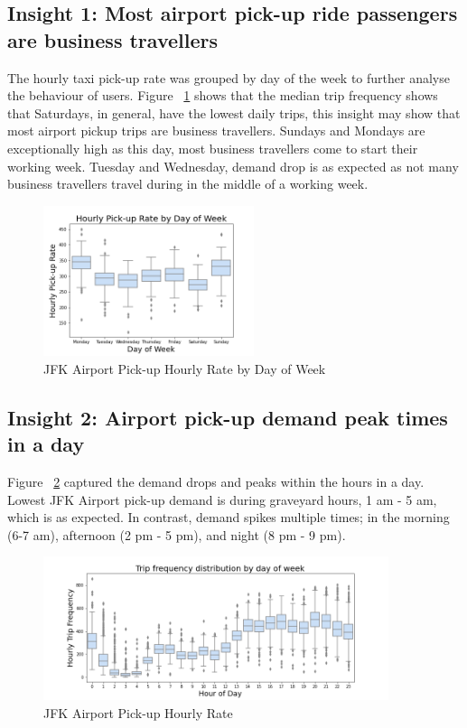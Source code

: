 \documentclass[11pt]{article}
\begin{document}
\subsection{Insight 1: Most airport pick-up ride passengers are business travellers}
The hourly taxi pick-up rate was grouped by day of the week to further analyse the behaviour of users. Figure ~\ref{fig:hour_dow} shows that the median trip frequency shows that Saturdays, in general, have the lowest daily trips, this insight may show that most airport pickup trips are business travellers. Sundays and Mondays are exceptionally high as this day, most business travellers come to start their working week. Tuesday and Wednesday, demand drop is as expected as not many business travellers travel during in the middle of a working week.
\begin{figure}[h]
    \includegraphics[width=0.55\textwidth]{plots/hourly_pickup_rate_by_dow.png}
    \centering
    \caption{JFK Airport Pick-up Hourly Rate by Day of Week} 
    \label{fig:hour_dow}
\end{figure}


\subsection{Insight 2: Airport pick-up demand peak times in a day}
Figure ~\ref{fig:hour} captured the demand drops and peaks within the hours in a day. Lowest JFK Airport pick-up demand is during graveyard hours, 1 am - 5 am, which is as expected. In contrast, demand spikes multiple times; in the morning (6-7 am), afternoon (2 pm - 5 pm), and night (8 pm - 9 pm).
\begin{figure}[h]
    \includegraphics[width=0.9\textwidth]{plots/hourly_pickup_rate.png}
    \centering
    \caption{JFK Airport Pick-up Hourly Rate} 
    \label{fig:hour}
\end{figure}
\end{document}
